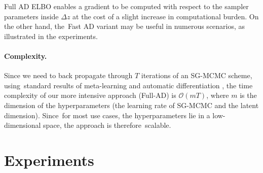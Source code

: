  Full AD ELBO enables a gradient to be computed
 with respect to the sampler parameters inside $\Delta z$ at the cost of a slight increase in computational burden.
 On the other hand, the~Fast AD variant may be useful in numerous scenarios, as illustrated in the experiments.

\paragraph{Complexity.} 
Since we need to back propagate through $T$ iterations of an SG-MCMC scheme, using~standard results of meta-learning and automatic differentiation \cite{franceschi2017forward}, the time complexity of our more intensive approach (Full-AD) is $\mathcal{O}(mT)$, where $m$ is the dimension of the hyperparameters (the learning rate of SG-MCMC and the latent dimension). Since~for most use cases, the hyperparameters lie in a low-dimensional space, the approach is
therefore~scalable.















\section{Experiments}\label{sec:exps_vis}

